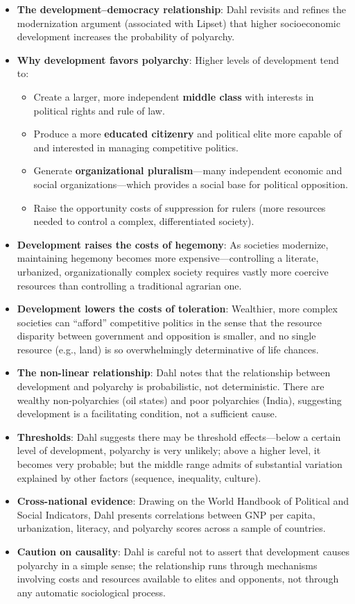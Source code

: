 \documentclass[12pt]{article}
\begin{document}
\begin{itemize}[leftmargin=*, itemsep=4pt]
    \item \textbf{The development--democracy relationship}: Dahl revisits and refines the modernization argument (associated with Lipset) that higher socioeconomic development increases the probability of polyarchy.
    \item \textbf{Why development favors polyarchy}: Higher levels of development tend to:
        \begin{itemize}
            \item Create a larger, more independent \textbf{middle class} with interests in political rights and rule of law.
            \item Produce a more \textbf{educated citizenry} and political elite more capable of and interested in managing competitive politics.
            \item Generate \textbf{organizational pluralism}---many independent economic and social organizations---which provides a social base for political opposition.
            \item Raise the opportunity costs of suppression for rulers (more resources needed to control a complex, differentiated society).
        \end{itemize}
    \item \textbf{Development raises the costs of hegemony}: As societies modernize, maintaining hegemony becomes more expensive---controlling a literate, urbanized, organizationally complex society requires vastly more coercive resources than controlling a traditional agrarian one.
    \item \textbf{Development lowers the costs of toleration}: Wealthier, more complex societies can ``afford'' competitive politics in the sense that the resource disparity between government and opposition is smaller, and no single resource (e.g., land) is so overwhelmingly determinative of life chances.
    \item \textbf{The non-linear relationship}: Dahl notes that the relationship between development and polyarchy is probabilistic, not deterministic. There are wealthy non-polyarchies (oil states) and poor polyarchies (India), suggesting development is a facilitating condition, not a sufficient cause.
    \item \textbf{Thresholds}: Dahl suggests there may be threshold effects---below a certain level of development, polyarchy is very unlikely; above a higher level, it becomes very probable; but the middle range admits of substantial variation explained by other factors (sequence, inequality, culture).
    \item \textbf{Cross-national evidence}: Drawing on the World Handbook of Political and Social Indicators, Dahl presents correlations between GNP per capita, urbanization, literacy, and polyarchy scores across a sample of countries.
    \item \textbf{Caution on causality}: Dahl is careful not to assert that development causes polyarchy in a simple sense; the relationship runs through mechanisms involving costs and resources available to elites and opponents, not through any automatic sociological process.
\end{itemize}
\end{document}

